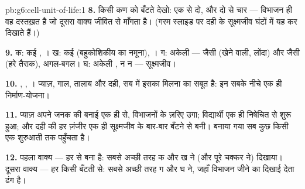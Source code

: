 \begin{solution}{pb:g6:cell-unit-of-life:1}
\textbf{8.} किसी कण को बँटते देखो: एक से दो, और दो से चार --- विभाजन ही
वह दस्तख़त है जो दूसरा वाक्य जीवित से माँगता है। (गरम स्लाइड पर दही के
सूक्ष्मजीव घंटों में यह कर दिखाते हैं।)

\textbf{9.} क: कई , । ख: कई  (बहुकोशिकीय  का
नमूना), । ग: अकेली  ---  जैसी (खेने वाली, लोंदा) और
 जैसी (हरे तैराक), अगल-बगल। घ: अकेली , न  न  ---
सूक्ष्मजीव।

\textbf{10.} , , । प्याज़, गाल, तालाब और दही,
सब में इसका मिलना  का सबूत है: इन सबके नीचे एक ही
निर्माण-योजना।

\textbf{11.} प्याज़ अपने जनक  की बनाई एक ही  से, विभाजनों के
ज़रिए उगा; विद्यार्थी एक ही निषेचित  से शुरू हुआ; और दही की हर
ज़ंजीर एक ही सूक्ष्मजीव के बार-बार बँटने से बनी। बनाया गया सब कुछ किसी
एक शुरुआती  तक पहुँचता है।

\textbf{12.} पहला वाक्य --- हर   से बना है: सबसे अच्छी तरह
क और ख ने (और पूरे चक्कर ने) दिखाया। दूसरा वाक्य --- हर  किसी
बँटती  से: सबसे अच्छी तरह ग और घ ने, जहाँ विभाजन जीने का दिखाई
देता ढंग है।
\end{solution}
